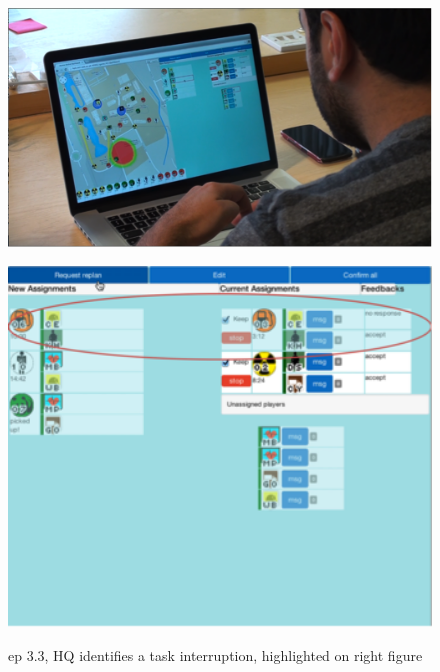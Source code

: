 \begin{figure}[ht]
\centering
\begin{minipage}[b]{0.45\linewidth}
\includegraphics[width=1\textwidth]{img/study3/ep31}

\label{fig:study3ep31}
\end{minipage}
\quad
\begin{minipage}[b]{0.45\linewidth}
 \includegraphics[width=1\textwidth]{img/study3/ep32}

\label{fig:study3ep32}
\end{minipage}
\caption{ep 3.3, HQ identifies a task interruption, highlighted on right figure}
\end{figure}


